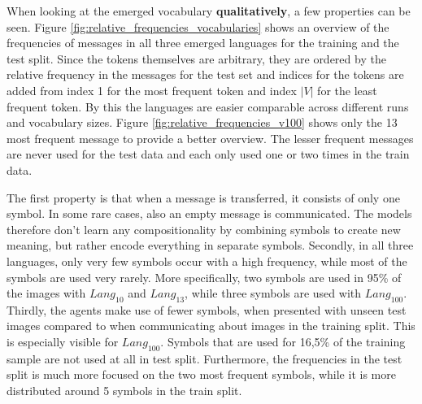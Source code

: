 When looking at the emerged vocabulary \textbf{qualitatively}, a few properties can be seen.
Figure \ref{fig:relative_frequencies_vocabularies} shows an overview of the frequencies of messages in all three emerged languages for the training and the test split.
Since the tokens themselves are arbitrary, they are ordered by the relative frequency in the messages for the test set and indices for the tokens are added from index 1 for the most frequent token and index $|V|$ for the least frequent token.
By this the languages are easier comparable across different runs and vocabulary sizes.
Figure \ref{fig:relative_frequencies_v100} shows only the 13 most frequent message to provide a better overview.
The lesser frequent messages are never used for the test data and each only used one or two times in the train data.

The first property is that when a message is transferred, it consists of only one symbol.
In some rare cases, also an empty message is communicated.
The models therefore don't learn any compositionality by combining symbols to create new meaning, but rather encode everything in separate symbols.
Secondly, in all three languages, only very few symbols occur with a high frequency, while most of the symbols are used very rarely.
More specifically, two symbols are used in 95\% of the images with $Lang_{10}$ and $Lang_{13}$, while three symbols are used with $Lang_{100}$.
Thirdly, the agents make use of fewer symbols, when presented with unseen test images compared to when communicating about images in the training split.
This is especially visible for $Lang_{100}$.
Symbols that are used for 16,5\% of the training sample are not used at all in test split.
Furthermore, the frequencies in the test split is much more focused on the two most frequent symbols, while it is more distributed around 5 symbols in the train split.

